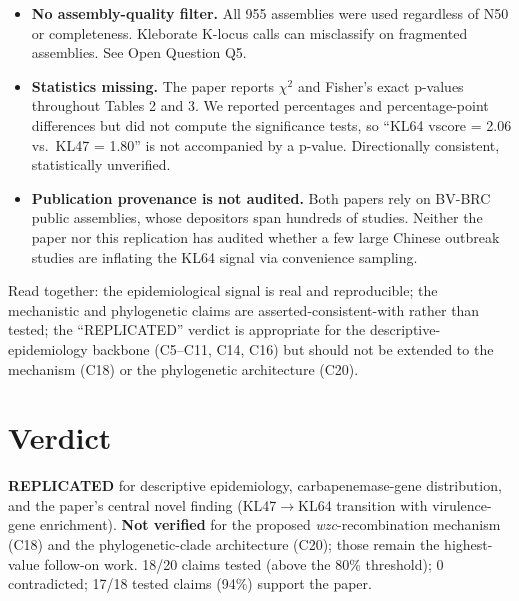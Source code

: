 \documentclass[11pt]{article}
\begin{document}
\begin{itemize}[leftmargin=*, itemsep=2pt]
    than a real reduction; we cannot tell without a controlled cross-version audit.
  \item \textbf{No assembly-quality filter.} All 955 assemblies were used regardless of
    N50 or completeness. Kleborate K-locus calls can misclassify on fragmented
    assemblies. See Open Question Q5.
  \item \textbf{Statistics missing.} The paper reports $\chi^2$ and Fisher's exact
    p-values throughout Tables 2 and 3. We reported percentages and percentage-point
    differences but did not compute the significance tests, so ``KL64 vscore = 2.06 vs.\
    KL47 = 1.80'' is not accompanied by a p-value. Directionally consistent, statistically
    unverified.
  \item \textbf{Publication provenance is not audited.} Both papers rely on BV-BRC public
    assemblies, whose depositors span hundreds of studies. Neither the paper nor this
    replication has audited whether a few large Chinese outbreak studies are inflating
    the KL64 signal via convenience sampling.
\end{itemize}

Read together: the epidemiological signal is real and reproducible; the mechanistic and
phylogenetic claims are asserted-consistent-with rather than tested; the ``REPLICATED''
verdict is appropriate for the descriptive-epidemiology backbone (C5--C11, C14, C16) but
should not be extended to the mechanism (C18) or the phylogenetic architecture (C20).

\section{Verdict}
\textbf{REPLICATED} for descriptive epidemiology, carbapenemase-gene distribution, and the
paper's central novel finding (KL47$\rightarrow$KL64 transition with virulence-gene
enrichment). \textbf{Not verified} for the proposed \emph{wzc}-recombination mechanism
(C18) and the phylogenetic-clade architecture (C20); those remain the highest-value
follow-on work. 18/20 claims tested (above the 80\% threshold); 0 contradicted; 17/18
tested claims (94\%) support the paper.
\end{document}
